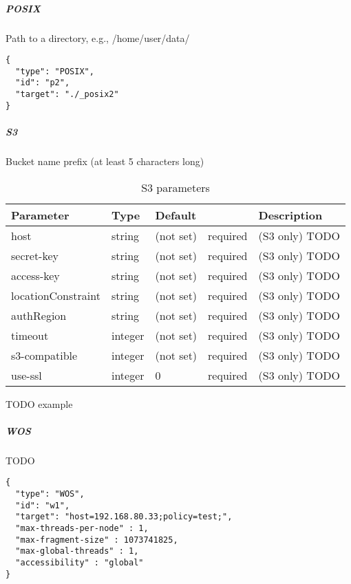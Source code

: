 \subparagraph{POSIX}

Path to a directory, e.g., /home/user/data/

\begin{lstlisting}
{
  "type": "POSIX",
  "id": "p2",
  "target": "./_posix2"
}
\end{lstlisting}

\subparagraph{S3}
Bucket name prefix (at least 5 characters long)

\begin{preserve}
\begin{table}[!h]
  \begin{center}
    \begin{tabularx}{\textwidth}{llllX}
      Parameter              & Type    & Default    &          & Description \\
      \hline
      host                   & string  & (not set)  & required & (S3 only) TODO \\
      secret-key             & string  & (not set)  & required & (S3 only) TODO \\
      access-key             & string  & (not set)  & required & (S3 only) TODO \\
      locationConstraint     & string  & (not set)  & required & (S3 only) TODO \\
      authRegion             & string  & (not set)  & required & (S3 only) TODO \\
      timeout                & integer & (not set)  & required & (S3 only) TODO \\
      s3-compatible          & integer & (not set)  & required & (S3 only) TODO \\
      use-ssl                & integer & 0          & required & (S3 only) TODO \\
    \end{tabularx}
  \end{center}
  \caption{S3 parameters}%
  \label{tab:s3_params}
\end{table}
\end{preserve}

TODO example

\subparagraph{WOS}
TODO

\begin{lstlisting}
{
  "type": "WOS",
  "id": "w1",
  "target": "host=192.168.80.33;policy=test;",
  "max-threads-per-node" : 1,
  "max-fragment-size" : 1073741825,
  "max-global-threads" : 1,
  "accessibility" : "global"
}
\end{lstlisting}


